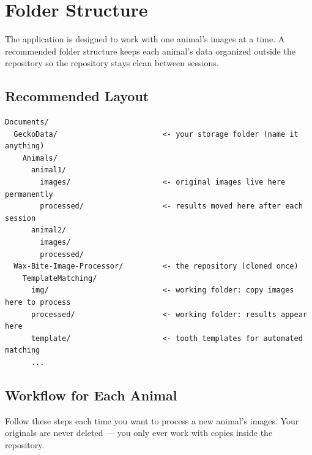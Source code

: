 \documentclass[11pt, letterpaper]{article}
\begin{document}
\section{Folder Structure}

The application is designed to work with one animal's images at a time. A recommended folder
structure keeps each animal's data organized outside the repository so the repository stays clean
between sessions.

\subsection*{Recommended Layout}

\begin{lstlisting}
Documents/
  GeckoData/                        <- your storage folder (name it anything)
    Animals/
      animal1/
        images/                     <- original images live here permanently
        processed/                  <- results moved here after each session
      animal2/
        images/
        processed/
  Wax-Bite-Image-Processor/         <- the repository (cloned once)
    TemplateMatching/
      img/                          <- working folder: copy images here to process
      processed/                    <- working folder: results appear here
      template/                     <- tooth templates for automated matching
      ...
\end{lstlisting}

\subsection*{Workflow for Each Animal}

Follow these steps each time you want to process a new animal's images. Your originals are
never deleted --- you only ever work with copies inside the repository.
\end{document}
